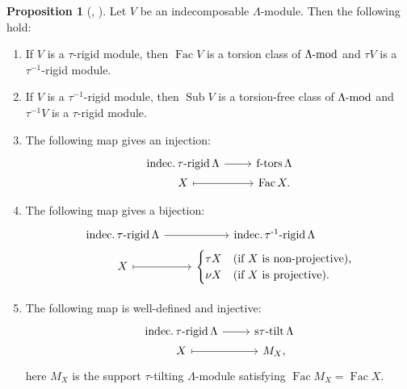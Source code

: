 \documentclass[pdftex,a4paper]{article}
\numberwithin{equation}{subsection}
\theoremstyle{definition}
\newtheorem{proposition}[theorem]{Proposition}
\newcommand{\lmod}{\operatorname{\mathrm{\hspace{-2pt}-mod}}}
\newcommand{\stautilt}{\operatorname{\mathrm{s\tau-tilt}}}
\newcommand{\itaurigid}{\operatorname{\mathrm{indec.\tau-rigid}}}
\newcommand{\itauirigid}{\operatorname{\mathrm{indec.\tau^{-1}-rigid}}}
\newcommand{\ftors}{\operatorname{\mathrm{f-tors}}}
\newcommand{\Fac}{\operatorname{\mathrm{Fac}}}
\newcommand{\Sub}{\operatorname{\mathrm{Sub}}}
\begin{document}
\begin{proposition}[{\cite[Theorem 5.10]{MR617088}, \cite[Lemma 4.3, Lemma 4,4]{MR3910476}}]
	\label{indec tau taui corr2021-09-09 16:44:38}
	Let \(V\) be an indecomposable \(\Lambda\)-module. Then the following hold:
	\begin{enumerate}
		\item If \(V\) is a \(\tau\)-rigid module, then \(\Fac V\) is a torsion class of \(\Lambda\lmod\) and \(\tau V\) is a \(\tau^{-1}\)-rigid module.
		\item If \(V\) is a \(\tau^{-1}\)-rigid module, then \(\Sub V\) is a torsion-free class of \(\Lambda\lmod\) and \(\tau^{-1} V\) is a \(\tau\)-rigid module.
		\item The following map gives an injection:
		      \begin{equation}\label{2021-09-22 14:17:22}
			      \begin{tikzcd}[row sep=1pt]
				      \itaurigid \Lambda \ar[r] &\ftors \Lambda\\
				      X\ar[r,mapsto]&\Fac X.
			      \end{tikzcd}
		      \end{equation}
		\item The following map gives a bijection:
		      \begin{equation}\label{tau or top 2021-09-11 19:19:09}
			      \begin{tikzcd}[ampersand replacement=\&,row sep=1pt]
				      \itaurigid \Lambda \ar[r] \&\itauirigid \Lambda\\
				      X\ar[r,mapsto]\&\begin{cases}
					      \tau X & \text{(if \(X\) is non-projective),} \\
					      \nu X  & \text{(if \(X\) is projective)}.
				      \end{cases}
			      \end{tikzcd}
		      \end{equation}
		\item The following map is well-defined and injective:
		      \begin{equation}\label{2021-09-22 15:21:57}
			      \begin{tikzcd}[row sep=1pt]
				      \itaurigid \Lambda \ar[r]&\stautilt \Lambda\\
				      X\ar[r,mapsto] & M_X,
			      \end{tikzcd}
		      \end{equation}
		      here \(M_X\) is the support \(\tau\)-tilting \(\Lambda\)-module satisfying \(\Fac M_X=\Fac X\).

\end{enumerate}
\end{proposition}
\end{document}
